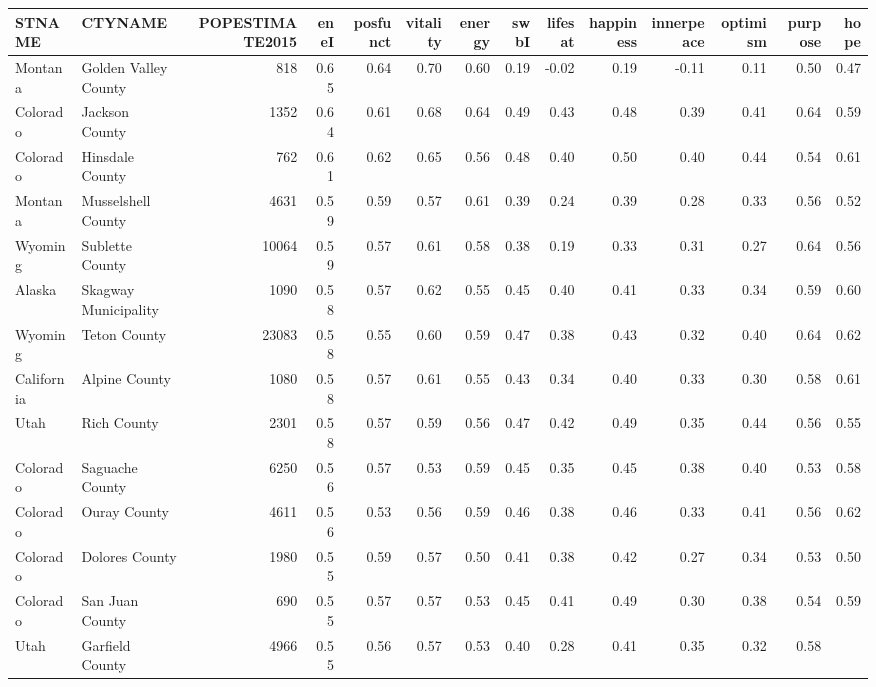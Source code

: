 \documentclass[10pt, letterpaper]{article}
\renewcommand\arraystretch{.9}                    %
\begin{document}
\begin{spacing}{1.4}
\begin{table}
  \centering
{\renewcommand{\arraystretch}{.5}\tiny
  \begin{tabular}{llrrrrrrrrrrrr} \hline STNAME & CTYNAME & POPESTIMATE2015 &
    eneI & posfunct & vitality & energy & swbI & lifesat & happiness &
    innerpeace & optimism & purpose & hope \\ \hline Montana & Golden Valley
    County & 818 & 0.65 & 0.64 & 0.70 & 0.60 & 0.19 &
    -0.02 & 0.19 & -0.11 & 0.11 & 0.50 & 0.47 \\
    Colorado & Jackson County & 1352 & 0.64 & 0.61 & 0.68 & 0.64
    & 0.49 & 0.43 & 0.48 & 0.39 & 0.41 & 0.64 & 0.59
    \\ Colorado & Hinsdale County & 762 & 0.61 & 0.62 & 0.65 &
    0.56 & 0.48 & 0.40 & 0.50 & 0.40 & 0.44 & 0.54 &
    0.61 \\ Montana & Musselshell County & 4631 & 0.59 & 0.59 &
    0.57 & 0.61 & 0.39 & 0.24 & 0.39 & 0.28 & 0.33 &
    0.56 & 0.52 \\ Wyoming & Sublette County & 10064 & 0.59 &
    0.57 & 0.61 & 0.58 & 0.38 & 0.19 & 0.33 & 0.31 &
    0.27 & 0.64 & 0.56 \\ Alaska & Skagway Municipality & 1090 &
    0.58 & 0.57 & 0.62 & 0.55 & 0.45 & 0.40 & 0.41 &
    0.33 & 0.34 & 0.59 & 0.60 \\ Wyoming & Teton County & 23083
    & 0.58 & 0.55 & 0.60 & 0.59 & 0.47 & 0.38 & 0.43
    & 0.32 & 0.40 & 0.64 & 0.62 \\ California & Alpine County &
    1080 & 0.58 & 0.57 & 0.61 & 0.55 & 0.43 & 0.34 &
    0.40 & 0.33 & 0.30 & 0.58 & 0.61 \\ Utah & Rich County &
    2301 & 0.58 & 0.57 & 0.59 & 0.56 & 0.47 & 0.42 &
    0.49 & 0.35 & 0.44 & 0.56 & 0.55 \\ Colorado & Saguache
    County & 6250 & 0.56 & 0.57 & 0.53 & 0.59 & 0.45 &
    0.35 & 0.45 & 0.38 & 0.40 & 0.53 & 0.58 \\ Colorado
    & Ouray County & 4611 & 0.56 & 0.53 & 0.56 & 0.59 & 0.46
    & 0.38 & 0.46 & 0.33 & 0.41 & 0.56 & 0.62 \\
    Colorado & Dolores County & 1980 & 0.55 & 0.59 & 0.57 & 0.50
    & 0.41 & 0.38 & 0.42 & 0.27 & 0.34 & 0.53 & 0.50
    \\ Colorado & San Juan County & 690 & 0.55 & 0.57 & 0.57 &
    0.53 & 0.45 & 0.41 & 0.49 & 0.30 & 0.38 & 0.54 &
    0.59 \\ Utah & Garfield County & 4966 & 0.55 & 0.56 & 0.57 &
    0.53 & 0.40 & 0.28 & 0.41 & 0.35 & 0.32 & 0.58 &

\end{tabular}}
\end{table}
\end{spacing}
\end{document}
